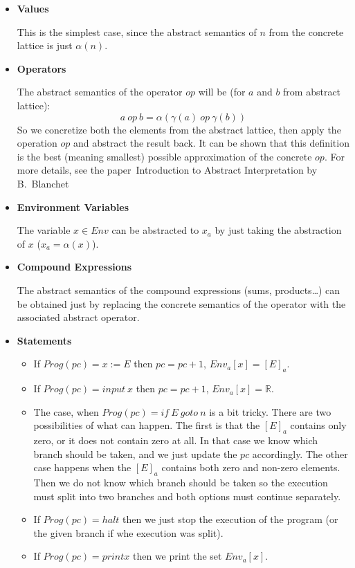 \begin{itemize}
    \item \textbf{Values}

    This is the simplest case, since the abstract semantics of $n$ from the concrete lattice is just $\alpha(n)$.

    \item \textbf{Operators}

    The abstract semantics of the operator $op$ will be (for $a$ and $b$ from abstract lattice):
    \[a \: op \: b = \alpha(\gamma(a) \: op \: \gamma(b))\]
    So we concretize both the elements from the abstract lattice, then apply the operation $op$ and abstract the result
    back.
    It can be shown that this definition is the best (meaning smallest) possible approximation of the concrete $op$.
    For more details, see the paper~Introduction to Abstract Interpretation by B.~Blanchet\cite{Blanchet:2002:AI}


    \item \textbf{Environment Variables}

    The variable $x \in Env$ can be abstracted to $x_a$ by just taking the abstraction of $x$ ($x_a = \alpha(x)$).

    \item \textbf{Compound Expressions}

    The abstract semantics of the compound expressions (sums, products\ldots) can be obtained just by replacing the
    concrete semantics of the operator with the associated abstract operator.

    \item \textbf{Statements}

    \begin{itemize}
        \item
        If $Prog(pc) = x := E$ then
        $pc = pc + 1$, $Env_a[x] = [E]_a$.

        \item
        If $Prog(pc) = input \: x$ then
        $pc = pc + 1$, $Env_a[x] = \mathbb{R}$.

        \item
        The case, when $Prog(pc) = if \: E \: goto \: n$ is a bit tricky.
        There are two possibilities of what can happen.
        The first is that the $[E]_a$ contains only zero, or it does not contain zero at all.
        In that case we know which branch should be taken, and we just update the $pc$ accordingly.
        The other case happens when the $[E]_a$ contains both zero and non-zero elements.
        Then we do not know which branch should be taken so the execution must split into two branches and both options
        must continue separately.

        \item
        If $Prog(pc) = halt$ then we just stop the execution of the program (or the given branch if whe execution was
        split).

        \item
        If $Prog(pc) = print x$ then we print the set $Env_a[x].$
    \end{itemize}
\end{itemize}


